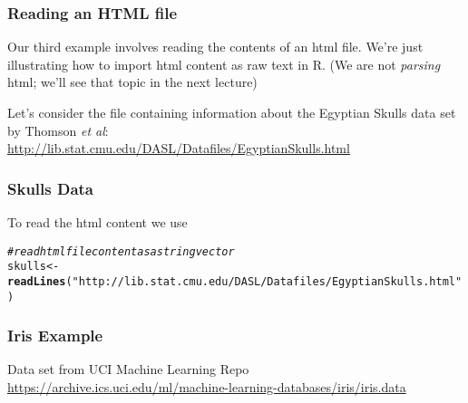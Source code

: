 \documentclass[12pt]{beamer}\usepackage[]{graphicx}\usepackage[]{color}
\makeatletter
\newcommand{\hlstr}[1]{\textcolor[rgb]{0.192,0.494,0.8}{#1}}%
\newcommand{\hlcom}[1]{\textcolor[rgb]{0.678,0.584,0.686}{\textit{#1}}}%
\newcommand{\hlstd}[1]{\textcolor[rgb]{0.345,0.345,0.345}{#1}}%
\newcommand{\hlkwb}[1]{\textcolor[rgb]{0.69,0.353,0.396}{#1}}%
\newcommand{\hlkwd}[1]{\textcolor[rgb]{0.737,0.353,0.396}{\textbf{#1}}}%
\newenvironment{kframe}{%
 \def\at@end@of@kframe{}%
 \ifinner\ifhmode%
  \def\at@end@of@kframe{\end{minipage}}%
  \begin{minipage}{\columnwidth}%
 \fi\fi%
 \def\FrameCommand##1{\hskip\@totalleftmargin \hskip-\fboxsep
 \colorbox{shadecolor}{##1}\hskip-\fboxsep
     \hskip-\linewidth \hskip-\@totalleftmargin \hskip\columnwidth}%
 \MakeFramed {\advance\hsize-\width
   \@totalleftmargin\z@ \linewidth\hsize
   \@setminipage}}%
 {\par\unskip\endMakeFramed%
 \at@end@of@kframe}
\newenvironment{knitrout}{}{} %
\makeatother
\begin{document}

\begin{frame}[fragile]
\frametitle{Reading an HTML file}

Our third example involves reading the contents of an html file. We're just illustrating how to import html content as raw text in R. (We are not \textit{parsing} html; we'll see that topic in the next lecture)
\eb

Let's consider the file containing information about the Egyptian Skulls data set by Thomson \textit{et al}: \\
{ \scriptsize \url{http://lib.stat.cmu.edu/DASL/Datafiles/EgyptianSkulls.html}}
\eb

\end{frame}


\begin{frame}[fragile]
\frametitle{Skulls Data}

To read the html content we use {\hilit {}}

\begin{knitrout}\tiny
{}\color{fgcolor}\begin{kframe}
\begin{alltt}
\hlcom{# read html file content as a string vector}
\hlstd{skulls} \hlkwb{<-} \hlkwd{readLines}\hlstd{(}\hlstr{"http://lib.stat.cmu.edu/DASL/Datafiles/EgyptianSkulls.html"}\hlstd{)}
\end{alltt}
\end{kframe}
\end{knitrout}

\end{frame}


\begin{frame}[fragile]
\frametitle{Iris Example}

Data set {\hilit {}} from UCI Machine Learning Repo \\
{\scriptsize 
\url{https://archive.ics.uci.edu/ml/machine-learning-databases/iris/iris.data}}
\eb

\end{frame}

\end{document}
